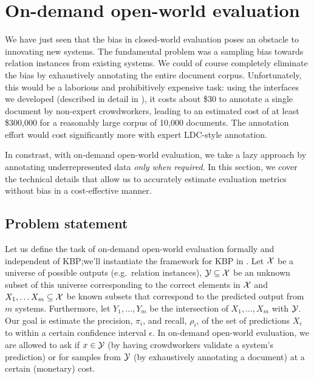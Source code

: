 \section{On-demand open-world evaluation}
\label{sec:methodology}

We have just seen that the bias in closed-world evaluation poses an obstacle to innovating new systems.
The fundamental problem was a sampling bias towards relation instances from existing systems.
We could of course completely eliminate the bias by exhaustively annotating the entire document corpus.
Unfortunately, this would be a laborious and prohibitively expensive task:
  using the interfaces we developed (described in detail in ), it costs about \$30 to annotate a single document by non-expert crowdworkers, leading to an estimated cost of at least \$300,000 for a reasonably large corpus of 10,000 documents.
The annotation effort would cost significantly more with expert LDC-style annotation.

In constrast, with on-demand open-world evaluation, we take a lazy approach by annotating underrepresented data \textit{only when required}.
In this section, we cover the technical details that allow us to accurately estimate evaluation metrics without bias in a cost-effective manner. 


\subsection{Problem statement}

Let us define the task of on-demand open-world evaluation formally and independent of KBP;\@ we'll instantiate the framework for KBP in .
Let $\mathcal{X}$ be a universe of possible outputs (e.g.\ relation instances),
  $\mathcal{Y} \subseteq \mathcal{X}$ be an unknown subset of this universe corresponding to the correct elements in $\mathcal{X}$ and
  $X_1, \ldots X_m \subseteq \mathcal{X}$ be known subsets that correspond to the predicted output from $m$ systems.
Furthermore, let $Y_1, \ldots, Y_m$ be the intersection of $X_1, \ldots, X_m$ with $\mathcal{Y}$.
Our goal is estimate the precision, $\pi_i$, and recall, $\rho_i$, of the set of predictions $X_i$ to within a certain confidence interval $\epsilon$.
In on-demand open-world evaluation, we are allowed to ask if $x \in \mathcal{Y}$ (by having crowdworkers validate a system's prediction) or for samples from $\mathcal{Y}$ (by exhaustively annotating a document) at a certain (monetary) cost.

